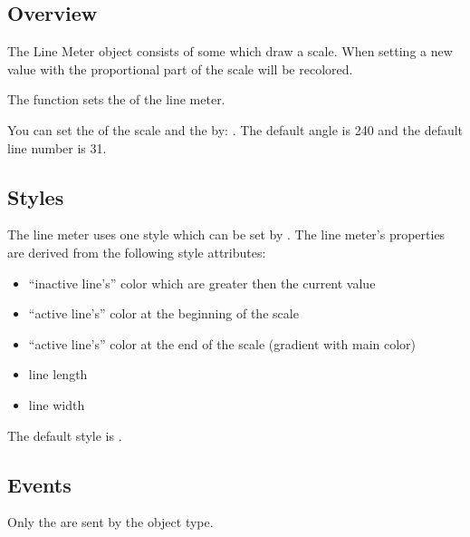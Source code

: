 \documentclass[letterpaper,10pt,english]{sphinxmanual}
\begin{document}
\subsection{Overview}
\label{\detokenize{object-types/lmeter:overview}}
The Line Meter object consists of some  which draw a scale. When setting a new value with  the proportional part of the scale will be recolored.

The  function sets the  of the line meter.

You can set the  of the scale and the  by: . The default angle is 240 and the default line number is 31.


\subsection{Styles}
\label{\detokenize{object-types/lmeter:styles}}
The line meter uses one style which can be set by . The line meter’s properties are derived from the following style attributes:
\begin{itemize}
\item {} 
 “inactive line’s” color which are greater then the current value

\item {} 
 “active line’s” color at the beginning of the scale

\item {} 
 “active line’s” color at the end of the scale (gradient with main color)

\item {} 
 line length

\item {} 
 line width

\end{itemize}

The default style is .


\subsection{Events}
\label{\detokenize{object-types/lmeter:events}}
Only the  are sent by the object type.
\end{document}
